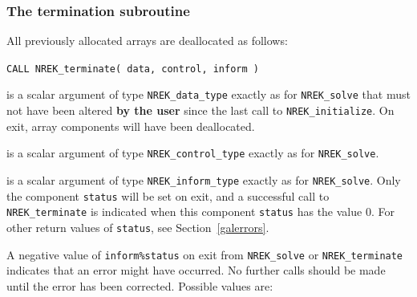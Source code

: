 \documentclass{galahad}
\newcommand{\packagename}{NREK}
\begin{document}

\subsubsection{The termination subroutine}
All previously allocated arrays are deallocated as follows:

\vspace*{2mm}
\hskip0.5in
{\tt CALL \packagename\_terminate( data, control, inform )}

\begin{description}

 is a scalar \intentinout argument of type
{\tt \packagename\_data\_type}
exactly as for
{\tt \packagename\_solve}
that must not have been altered {\bf by the user} since the last call to
{\tt \packagename\_initialize}.
On exit, array components will have been deallocated.

 is a scalar \intentin argument of type
{\tt \packagename\_control\_type}
exactly as for
{\tt \packagename\_solve}.

 is a scalar \intentout argument of type
{\tt \packagename\_inform\_type}
exactly as for
{\tt \packagename\_solve}.
Only the component {\tt status} will be set on exit, and a
successful call to
{\tt \packagename\_terminate}
is indicated when this  component {\tt status} has the value 0.
For other return values of {\tt status}, see Section~\ref{galerrors}.

\end{description}


\galerrors
A negative value of  {\tt inform\%status} on exit from
{\tt \packagename\_solve}
or
{\tt \packagename\_terminate}
indicates that an error might have occurred. No further calls should be made
until the error has been corrected. Possible values are:
\end{document}
